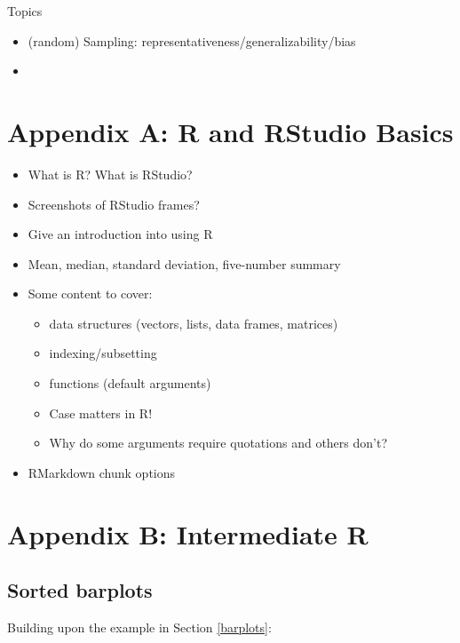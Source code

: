 \documentclass[]{tufte-book}
\newenvironment{Shaded}{\begin{snugshade}}{\end{snugshade}}
\newcommand{\KeywordTok}[1]{\textcolor[rgb]{0.13,0.29,0.53}{\textbf{{#1}}}}
\newcommand{\StringTok}[1]{\textcolor[rgb]{0.31,0.60,0.02}{{#1}}}
\newcommand{\NormalTok}[1]{{#1}}
\providecommand{\tightlist}{%
  \setlength{\itemsep}{0pt}\setlength{\parskip}{0pt}}
\begin{document}
Topics

\begin{itemize}
\item
  (random) Sampling: representativeness/generalizability/bias
\item
\end{itemize}

\chapter{Appendix A: R and RStudio Basics}\label{appendix1}

\begin{itemize}
\tightlist
\item
  What is R? What is RStudio?
\item
  Screenshots of RStudio frames?
\item
  Give an introduction into using R
\item
  Mean, median, standard deviation, five-number summary
\item
  Some content to cover:

  \begin{itemize}
  \tightlist
  \item
    data structures (vectors, lists, data frames, matrices)
  \item
    indexing/subsetting
  \item
    functions (default arguments)
  \item
    Case matters in R!
  \item
    Why do some arguments require quotations and others don't?
  \end{itemize}
\item
  RMarkdown chunk options
\end{itemize}

\chapter{Appendix B: Intermediate R}\label{appendix2}

\section{Sorted barplots}\label{sorted-barplots}

Building upon the example in Section \ref{barplots}:

\begin{Shaded}
\end{Shaded}
\end{document}
